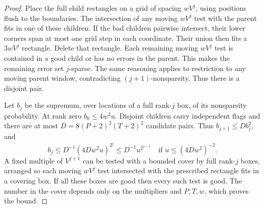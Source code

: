 \begin{proof}
Place the full child rectangles on a grid of spacing \(wV^j\), using positions flush to the boundaries. The intersection of any moving \(wV^j\) test with the parent fits in one of these children. If the bad children pairwise intersect, their lower corners span at most one grid step in each coordinate. Their union then fits a \(3wV^j\) rectangle. Delete that rectangle. Each remaining moving \(wV^j\) test is contained in a good child or has no errors in the parent. This makes the remaining error set \(j\)-sparse. The same reasoning applies to restriction to any moving parent window, contradicting \((j+1)\)-nonsparsity. Thus there is a disjoint pair.

Let \(b_j\) be the supremum, over locations of a full rank-\(j\) box, of its nonsparsity probability. At rank zero \(b_0\le4w^2u\). Disjoint children carry independent flags and there are at most \(D=8(P+2)^2(T+2)^2\) candidate pairs. Thus \(b_{j+1}\le Db_j^2\), and
\[
b_j\le D^{-1}(4Dw^2u)^{2^j}\le D^{-1}u^{2^{j-1}}
\quad\text{if }u\le(4Dw^2)^{-2}.
\]
A fixed multiple of \(V^{j+1}\) can be tested with a bounded cover by full rank-\(j\) boxes, arranged so each moving \(wV^j\) test intersected with the prescribed rectangle fits in a covering box. If all these boxes are good then every such test is good. The number in the cover depends only on the multipliers and \(P,T,w\), which proves the bound.
\end{proof}
